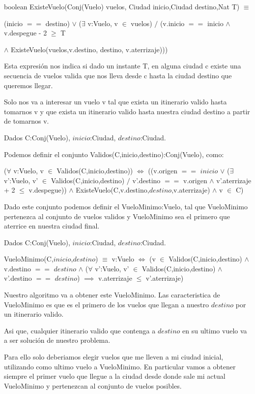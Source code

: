 boolean ExisteVuelo(Conj(Vuelo) vuelos, Ciudad inicio,Ciudad destino,Nat T) $\equiv$

(inicio $==$ destino) $\vee$ ($\exists$ v:Vuelo, v $\in$ vuelos) $/$ (v.inicio $==$ inicio $\wedge$ v.despegue - 2 $\geq$ T 

$\wedge$ ExisteVuelo(vuelos,v.destino, destino, v.aterrizaje))) 

Esta expresi\'on nos indica si dado un instante T, en alguna ciudad c existe una secuencia de vuelos valida que nos lleva desde c hasta la ciudad destino que queremos llegar.

Solo nos va a interesar un vuelo v tal que exista un itinerario valido hasta tomarnos v y que exista un itinerario valido hasta nuestra ciudad destino a partir de tomarnos v.

Dados C:Conj(Vuelo), $inicio$:Ciudad, $destino$:Ciudad.

Podemos definir el conjunto Validos(C,inicio,destino):Conj(Vuelo), como:

($\forall$ v:Vuelo, v $\in$ Validos(C,inicio,destino)) $\Leftrightarrow$ ((v.origen $==$ $inicio$ $\vee$ ($\exists$ v':Vuelo, v' $\in$ Validos(C,inicio,destino) $/$ v'.destino $==$ v.origen $\wedge$ v'.aterrizaje + 2 $\leq$ v.despegue)) $\wedge$ ExisteVuelo(C,v.destino,$destino$,v.aterrizaje) $\wedge$ v $\in$ C)

Dado este conjunto podemos definir el VueloMinimo:Vuelo, tal que VueloMinimo pertenezca al conjunto de vuelos validos y VueloMinimo sea el primero que aterrice en nuestra ciudad final.

Dados C:Conj(Vuelo), $inicio$:Ciudad, $destino$:Ciudad.

VueloMinimo(C,$inicio$,$destino$) $\equiv$ v:Vuelo $\Leftrightarrow$ (v $\in$ Validos(C,inicio,destino) $\wedge$ v.destino $==$ $destino$ $\wedge$ ($\forall$ v':Vuelo, v' $\in$ Validos(C,inicio,destino) $\wedge$ v'.destino $==$ $destino$) $\implies$ v.aterrizaje $\leq$ v'.aterrizaje)

Nuestro algoritmo va a obtener este VueloMinimo. Las caracteristica de VueloMinimo es que es el primero de los vuelos que llegan a nuestro $destino$ por un itinerario valido.

Asi que, cualquier itinerario valido que contenga a $destino$ en su ultimo vuelo va a ser soluci\'on de nuestro problema.

Para ello solo deberiamos elegir vuelos que me lleven a mi ciudad inicial, utilizando como ultimo vuelo a VueloMinimo. En particular vamos a obtener siempre el primer vuelo que llegue a la ciudad desde donde sale mi actual VueloMinimo y pertenezcan al conjunto de vuelos posibles.

